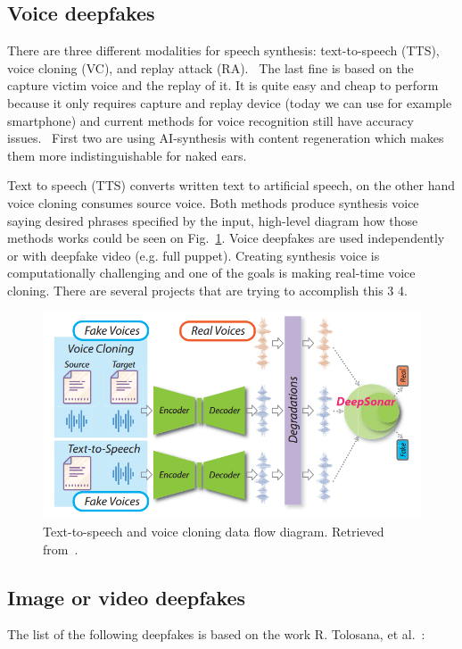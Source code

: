 \subsection{Voice deepfakes}

There are three different modalities for speech synthesis: text-to-speech (TTS), voice cloning (VC), and replay attack (RA).~\cite{Deepsonar} The last fine is based on the capture victim voice and the replay of it. It is quite easy and cheap to perform because it only requires capture and replay device (today we can use for example smartphone) and current methods for voice recognition still have accuracy issues.~\cite{ReplayAttackDetection} First two are using AI-synthesis with content regeneration which makes them more indistinguishable for naked ears.~\cite{Deepsonar}

Text to speech (TTS) converts written text to artificial speech, on the other hand voice cloning consumes source voice. Both methods produce synthesis voice saying desired phrases specified by the input, high-level diagram how those methods works could be seen on Fig.~\ref{fig:tts_vs}. Voice deepfakes are used independently or with deepfake video (e.g. full puppet). Creating synthesis voice is computationally challenging and one of the goals is making real-time voice cloning. There are several projects that are trying to accomplish this 3 4.

\begin{figure}[H]
    \centering
    \includegraphics[width=.62\linewidth]{other-fig/tts_vc.png}
    \caption{Text-to-speech and voice cloning data flow diagram. Retrieved from~\cite{Deepsonar}.}
\label{fig:tts_vs}
\end{figure}

\subsection{Image or video deepfakes}

The list of the following deepfakes is based on the work R. Tolosana, et al.~\cite{IntroductionToDigitalFaceManipulation}:

